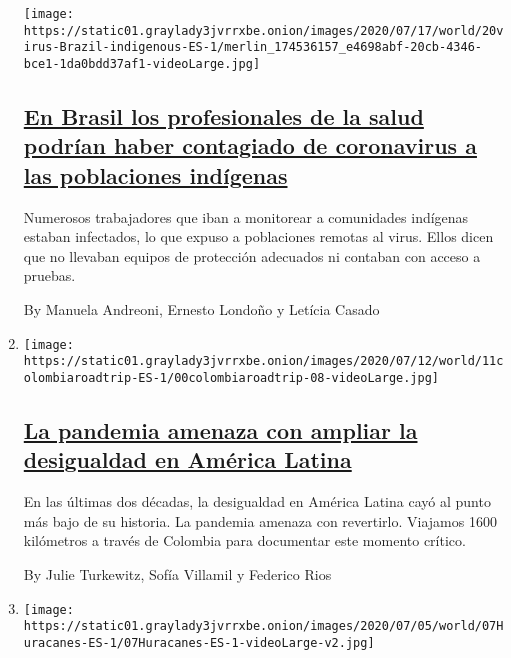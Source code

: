 \begin{enumerate}
  \texttt{[image: https://static01.graylady3jvrrxbe.onion/images/2020/07/17/world/20virus-Brazil-indigenous-ES-1/merlin\_174536157\_e4698abf-20cb-4346-bce1-1da0bdd37af1-videoLarge.jpg]}

  \hypertarget{en-brasil-los-profesionales-de-la-salud-podruxedan-haber-contagiado-de-coronavirus-a-las-poblaciones-induxedgenas}{%
  \subsection{\texorpdfstring{\href{/es/2020/07/20/espanol/america-latina/brasil-coronavirus-comunidades-indigenas.html}{En
  Brasil los profesionales de la salud podrían haber contagiado de
  coronavirus a las poblaciones
  indígenas}}{En Brasil los profesionales de la salud podrían haber contagiado de coronavirus a las poblaciones indígenas}}\label{en-brasil-los-profesionales-de-la-salud-podruxedan-haber-contagiado-de-coronavirus-a-las-poblaciones-induxedgenas}}

  Numerosos trabajadores que iban a monitorear a comunidades indígenas
  estaban infectados, lo que expuso a poblaciones remotas al virus.
  Ellos dicen que no llevaban equipos de protección adecuados ni
  contaban con acceso a pruebas.

  By Manuela Andreoni, Ernesto Londoño y Letícia Casado
\item
  \texttt{[image: https://static01.graylady3jvrrxbe.onion/images/2020/07/12/world/11colombiaroadtrip-ES-1/00colombiaroadtrip-08-videoLarge.jpg]}

  \hypertarget{la-pandemia-amenaza-con-ampliar-la-desigualdad-en-amuxe9rica-latina}{%
  \subsection{\texorpdfstring{\href{/es/2020/07/11/espanol/america-latina/desigualdad-coronavirus-america-latina-colombia.html}{La
  pandemia amenaza con ampliar la desigualdad en América
  Latina}}{La pandemia amenaza con ampliar la desigualdad en América Latina}}\label{la-pandemia-amenaza-con-ampliar-la-desigualdad-en-amuxe9rica-latina}}

  En las últimas dos décadas, la desigualdad en América Latina cayó al
  punto más bajo de su historia. La pandemia amenaza con revertirlo.
  Viajamos 1600 kilómetros a través de Colombia para documentar este
  momento crítico.

  By Julie Turkewitz, Sofía Villamil y Federico Rios
\item
  \texttt{[image: https://static01.graylady3jvrrxbe.onion/images/2020/07/05/world/07Huracanes-ES-1/07Huracanes-ES-1-videoLarge-v2.jpg]}


\end{enumerate}
